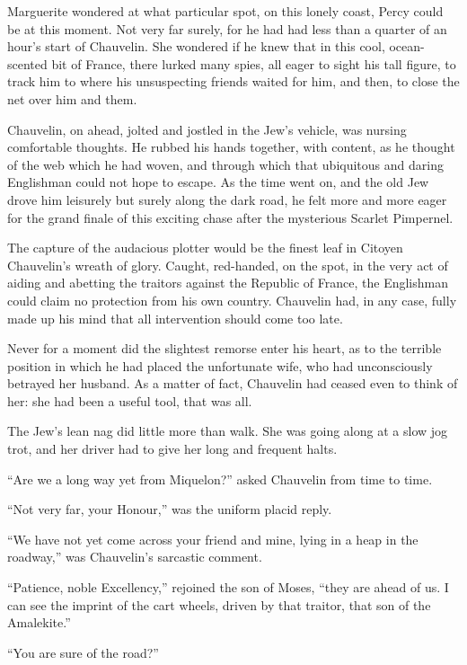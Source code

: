 \documentclass[paper=5.5in:8.5in,BCOR=7mm,twoside,DIV=calc,12pt,usegeometry,chapterprefix,endperiod,headings=big]{scrbook}
\begin{document}
Marguerite wondered at what particular spot, on this lonely coast, Percy could be at this moment. Not very far surely, for he had had less than a quarter of an hour's start of Chauvelin. She wondered if he knew that in this cool, ocean-scented bit of France, there lurked many spies, all eager to sight his tall figure, to track him to where his unsuspecting friends waited for him, and then, to close the net over him and them.

Chauvelin, on ahead, jolted and jostled in the Jew's vehicle, was nursing comfortable thoughts. He rubbed his hands together, with content, as he thought of the web which he had woven, and through which that ubiquitous and daring Englishman could not hope to escape. As the time went on, and the old Jew drove him leisurely but surely along the dark road, he felt more and more eager for the grand finale of this exciting chase after the mysterious Scarlet Pimpernel.

The capture of the audacious plotter would be the finest leaf in Citoyen Chauvelin's wreath of glory. Caught, red-handed, on the spot, in the very act of aiding and abetting the traitors against the Republic of France, the Englishman could claim no protection from his own country. Chauvelin had, in any case, fully made up his mind that all intervention should come too late.

Never for a moment did the slightest remorse enter his heart, as to the terrible position in which he had placed the unfortunate wife, who had unconsciously betrayed her husband. As a matter of fact, Chauvelin had ceased even to think of her: she had been a useful tool, that was all.

The Jew's lean nag did little more than walk. She was going along at a slow jog trot, and her driver had to give her long and frequent halts.

\enquote{Are we a long way yet from Miquelon?} asked Chauvelin from time to time.

\enquote{Not very far, your Honour,} was the uniform placid reply.

\enquote{We have not yet come across your friend and mine, lying in a heap in the roadway,} was Chauvelin's sarcastic comment.

\enquote{Patience, noble Excellency,} rejoined the son of Moses, \enquote{they are ahead of us. I can see the imprint of the cart wheels, driven by that traitor, that son of the Amalekite.}

\enquote{You are sure of the road?}
\end{document}
